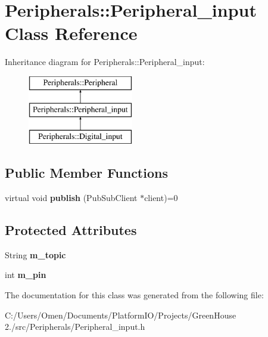 \hypertarget{class_peripherals_1_1_peripheral__input}{}\section{Peripherals\+:\+:Peripheral\+\_\+input Class Reference}
\label{class_peripherals_1_1_peripheral__input}
Inheritance diagram for Peripherals\+:\+:Peripheral\+\_\+input\+:\begin{figure}[H]
\begin{center}
\leavevmode
\includegraphics[height=3.000000cm]{class_peripherals_1_1_peripheral__input}
\end{center}
\end{figure}
\subsection*{Public Member Functions}
\begin{DoxyCompactItemize}
\item 
\mbox{\label{class_peripherals_1_1_peripheral__input_a7a5bba5eaf29249b132544a68ab437b9}} 
virtual void {\bfseries publish} (Pub\+Sub\+Client $\ast$client)=0
\end{DoxyCompactItemize}
\subsection*{Protected Attributes}
\begin{DoxyCompactItemize}
\item 
\mbox{\label{class_peripherals_1_1_peripheral__input_a29bc97c28521440cd963e592684c420e}} 
String {\bfseries m\+\_\+topic}
\item 
\mbox{\label{class_peripherals_1_1_peripheral__input_af10e22e88d182f186806544d69732657}} 
int {\bfseries m\+\_\+pin}
\end{DoxyCompactItemize}


The documentation for this class was generated from the following file\+:\begin{DoxyCompactItemize}
\item 
C\+:/\+Users/\+Omen/\+Documents/\+Platform\+I\+O/\+Projects/\+Green\+House 2./src/\+Peripherals/Peripheral\+\_\+input.\+h\end{DoxyCompactItemize}
